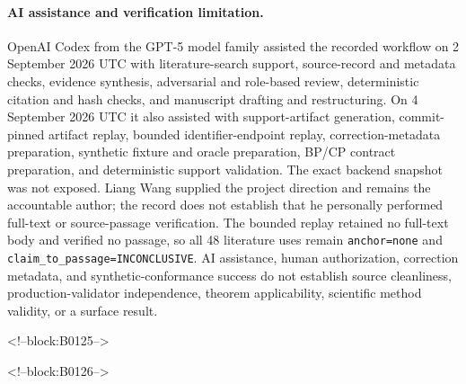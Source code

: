 \documentclass[11pt,a4paper]{article}
\begin{document}
\paragraph{AI assistance and verification limitation.}
OpenAI Codex from the GPT-5 model family assisted the recorded workflow on 2 September 2026 UTC with literature-search support, source-record and metadata checks, evidence synthesis, adversarial and role-based review, deterministic citation and hash checks, and manuscript drafting and restructuring. On 4 September 2026 UTC it also assisted with support-artifact generation, commit-pinned artifact replay, bounded identifier-endpoint replay, correction-metadata preparation, synthetic fixture and oracle preparation, BP/CP contract preparation, and deterministic support validation. The exact backend snapshot was not exposed. Liang Wang supplied the project direction and remains the accountable author; the record does not establish that he personally performed full-text or source-passage verification. The bounded replay retained no full-text body and verified no passage, so all 48 literature uses remain \texttt{anchor=none} and \texttt{claim\_to\_passage=INCONCLUSIVE}. AI assistance, human authorization, correction metadata, and synthetic-conformance success do not establish source cleanliness, production-validator independence, theorem applicability, scientific method validity, or a surface result.

<!--block:B0125-->



<!--block:B0126-->
\end{document}
